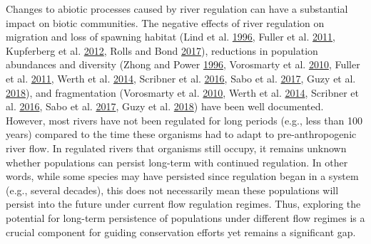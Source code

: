 \documentclass[proquest,12pt,final]{ucthesis-CA2012} %
\begin{document}
\begin{ucmainmatter}
Changes to abiotic processes caused by river regulation can have a
substantial impact on biotic communities. The negative effects of river
regulation on migration and loss of spawning habitat (Lind et al.
\protect\hyperlink{ref-lind_effects_1996}{1996}, Fuller et al.
\protect\hyperlink{ref-fuller_linking_2011}{2011}, Kupferberg et al.
\protect\hyperlink{ref-kupferberg_effects_2012}{2012}, Rolls and Bond
\protect\hyperlink{ref-rolls_environmental_2017}{2017}), reductions in
population abundances and diversity (Zhong and Power
\protect\hyperlink{ref-zhong_environmental_1996}{1996}, Vorosmarty et
al. \protect\hyperlink{ref-vorosmarty_global_2010}{2010}, Fuller et al.
\protect\hyperlink{ref-fuller_linking_2011}{2011}, Werth et al.
\protect\hyperlink{ref-werth_dams_2014}{2014}, Scribner et al.
\protect\hyperlink{ref-scribner_applications_2016}{2016}, Sabo et al.
\protect\hyperlink{ref-sabo_designing_2017}{2017}, Guzy et al.
\protect\hyperlink{ref-guzy_influence_2018}{2018}), and fragmentation
(Vorosmarty et al. \protect\hyperlink{ref-vorosmarty_global_2010}{2010},
Werth et al. \protect\hyperlink{ref-werth_dams_2014}{2014}, Scribner et
al. \protect\hyperlink{ref-scribner_applications_2016}{2016}, Sabo et
al. \protect\hyperlink{ref-sabo_designing_2017}{2017}, Guzy et al.
\protect\hyperlink{ref-guzy_influence_2018}{2018}) have been well
documented. However, most rivers have not been regulated for long
periods (e.g., less than 100 years) compared to the time these organisms
had to adapt to pre-anthropogenic river flow. In regulated rivers that
organisms still occupy, it remains unknown whether populations can
persist long-term with continued regulation. In other words, while some
species may have persisted since regulation began in a system (e.g.,
several decades), this does not necessarily mean these populations will
persist into the future under current flow regulation regimes. Thus,
exploring the potential for long-term persistence of populations under
different flow regimes is a crucial component for guiding conservation
efforts yet remains a significant gap.


\end{ucmainmatter}
\end{document}
